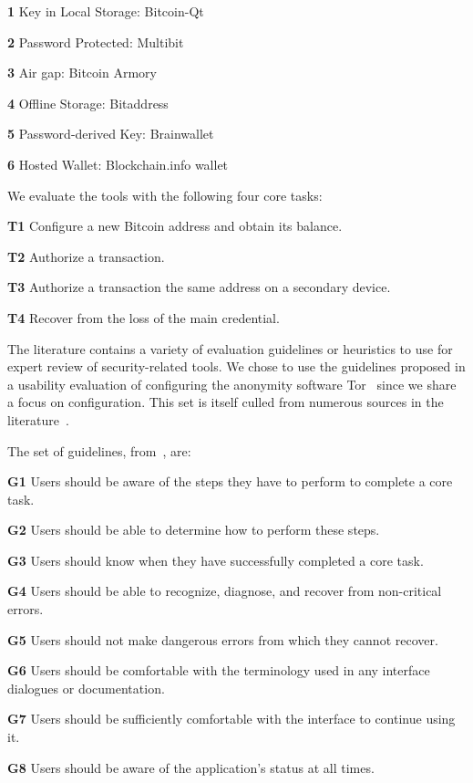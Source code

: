 \begin{compactlist}
	\item[\bf 1] Key in Local Storage: Bitcoin-Qt
	\item[\bf 2] Password Protected: Multibit 
	\item[\bf 3] Air gap: Bitcoin Armory
	\item[\bf 4] Offline Storage: Bitaddress
	\item[\bf 5] Password-derived Key: Brainwallet
	\item[\bf 6] Hosted Wallet: Blockchain.info wallet
\end{compactlist}

We evaluate the tools with the following four core tasks:

\begin{compactlist}
	\item[\bf T1] Configure a new Bitcoin address and obtain its balance.\label{sec:ct-1}
	\item[\bf T2] Authorize a transaction.\label{sec:ct-2}
	\item[\bf T3] Authorize a transaction the same address on a secondary device.\label{sec:ct-3}
	\item[\bf T4] Recover from the loss of the main credential.\label{sec:ct-4}
\end{compactlist}

The literature contains a variety of evaluation guidelines or heuristics to use for expert review of security-related tools. We chose to use the guidelines proposed in a usability evaluation of configuring the anonymity software Tor~\cite{COA07} since we share a focus on configuration. This set is itself culled from numerous sources in the literature~\cite{WRLP94,WT99,Cra03,KBK05,COB06}.

The set of guidelines, from~\cite{COA07}, are:
	
\begin{compactlist}
	\item[\bf G1] Users should be aware of the steps they have to perform to complete a core task.
	\item[\bf G2] Users should be able to determine how to perform these steps.
	\item[\bf G3] Users should know when they have successfully completed a core task.
	\item[\bf G4] Users should be able to recognize, diagnose, and recover from non-critical errors.
	\item[\bf G5] Users should not make dangerous errors from which they cannot recover.
	\item[\bf G6] Users should be comfortable with the terminology used in any interface dialogues or documentation.
	\item[\bf G7] Users should be sufficiently comfortable with the interface to continue using it.
	\item[\bf G8] Users should be aware of the application's status at all times.
\end{compactlist}

